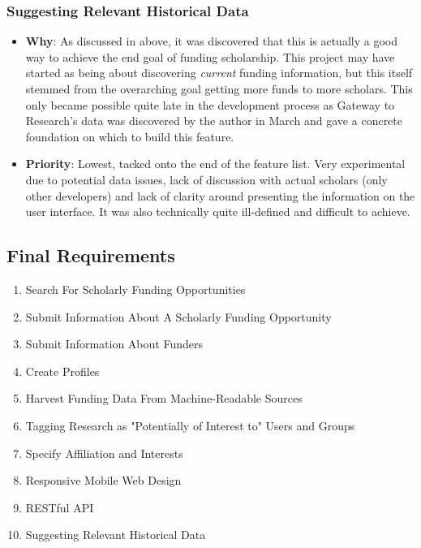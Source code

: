 \subsubsection{Suggesting Relevant Historical Data}
\begin{itemize}
 \item \textbf{Why}: As discussed in  above, it was discovered that this is actually a good way to achieve the end goal of funding scholarship. This project may have started as being about discovering \emph{current} funding information, but this itself stemmed from the overarching goal getting more funds to more scholars. This only became possible quite late in the development process as Gateway to Research's data was discovered by the author in March and gave a concrete foundation on which to build this feature.
 \item \textbf{Priority}: Lowest, tacked onto the end of the feature list. Very experimental due to potential data issues, lack of discussion with actual scholars (only other developers) and lack of clarity around presenting the information on the user interface. It was also technically quite ill-defined and difficult to achieve.
\end{itemize}

\subsection{Final Requirements}
\label{final-reqs}


\begin{enumerate}
\item Search For Scholarly Funding Opportunities
\item Submit Information About A Scholarly Funding Opportunity
\item Submit Information About Funders
\item Create Profiles
\item Harvest Funding Data From Machine-Readable Sources
\item Tagging Research as "Potentially of Interest to" Users and Groups
\item Specify Affiliation and Interests
\item Responsive Mobile Web Design
\item RESTful API
\item Suggesting Relevant Historical Data
\end{enumerate}


